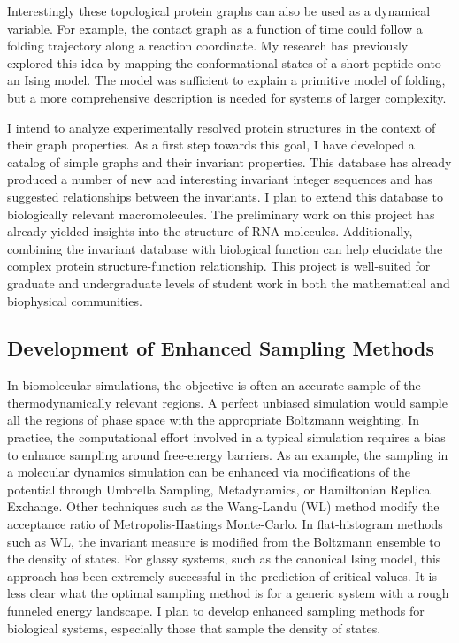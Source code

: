 \documentclass[]{scrartcl}
\newcommand{\insetpicture}[1]{\marginpar{\texttt{[image: \#1]}}}
\begin{document}
\begin{cleanCV}
Interestingly these topological protein graphs can also be used as a dynamical variable. 
For example, the contact graph as a function of time could follow a folding trajectory along a reaction coordinate.
My research has previously explored this idea by mapping the conformational states of a short peptide onto an Ising model. 
The model was sufficient to explain a primitive model of folding, but a more comprehensive description is needed for systems of larger complexity.

I intend to analyze experimentally resolved protein structures in the context of their graph properties.
As a first step towards this goal, I have developed a catalog of simple graphs and their invariant properties.
This database has already produced a number of new and interesting invariant integer sequences and has suggested relationships between the invariants.
\insetpicture{research_images/chromatic_zeros}
I plan to extend this database to biologically relevant macromolecules.
The preliminary work on this project has already yielded insights into the structure of RNA molecules.
Additionally, combining the invariant database with biological function can help elucidate the complex protein structure-function relationship.
This project is well-suited for graduate and undergraduate levels of student work in both the mathematical and biophysical communities.


\subsection{Development of Enhanced Sampling Methods}

In biomolecular simulations, the objective is often an accurate sample of the thermodynamically relevant regions.
A perfect unbiased simulation would sample all the regions of phase space with the appropriate Boltzmann weighting. 
In practice, the computational effort involved in a typical simulation requires a bias to enhance sampling around free-energy barriers.
As an example, the sampling in a molecular dynamics simulation can be enhanced via modifications of the potential through Umbrella Sampling, Metadynamics, or Hamiltonian Replica Exchange.
Other techniques such as the Wang-Landu (WL) method modify the acceptance ratio of Metropolis-Hastings Monte-Carlo.
\insetpicture{research_images/equilibrium}
In flat-histogram methods such as WL, the invariant measure is modified from the Boltzmann ensemble to the density of states.
For glassy systems, such as the canonical Ising model, this approach has been extremely successful in the prediction of critical values.
It is less clear what the optimal sampling method is for a generic system with a rough funneled energy landscape.
I plan to develop enhanced sampling methods for biological systems, especially those that sample the density of states.


\end{cleanCV}
\end{document}
